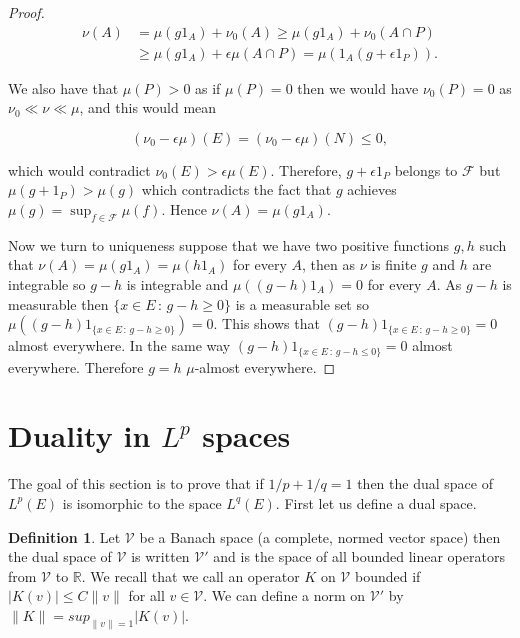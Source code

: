 \documentclass[
]{book}
\theoremstyle{definition}
\newtheorem{definition}{Definition}[chapter]
\theoremstyle{definition}
\theoremstyle{definition}
\theoremstyle{definition}
\theoremstyle{remark}
\begin{document}
\begin{proof}
\begin{align*}
\nu(A) &= \mu(g1_A) + \nu_0(A) \geq \mu(g1_A) + \nu_0(A \cap P) \\
& \geq \mu(g1_A) + \epsilon \mu(A \cap P) = \mu(1_A(g +\epsilon 1_{P})).
\end{align*}

We also have that \(\mu(P) >0\) as if \(\mu(P) = 0\) then we would have \(\nu_0(P)=0\) as \(\nu_0 \ll \nu \ll \mu\), and this would mean

\[ (\nu_0 - \epsilon \mu)(E) = (\nu_0 - \epsilon \mu)(N) \leq 0, \]

which would contradict \(\nu_0(E) > \epsilon \mu(E)\). Therefore, \(g+ \epsilon 1_P\) belongs to \(\mathcal{F}\) but \(\mu(g+1_P) > \mu(g)\) which contradicts the fact that \(g\) achieves \(\mu(g) = \sup_{f \in \mathcal{F}} \mu(f)\). Hence \(\nu(A) = \mu(g1_A)\).

Now we turn to uniqueness suppose that we have two positive functions \(g,h\) such that \(\nu(A) = \mu(g1_A) = \mu(h1_A)\) for every \(A\), then as \(\nu\) is finite \(g\) and \(h\) are integrable so \(g-h\) is integrable and \(\mu((g-h)1_A) = 0\) for every \(A\). As \(g-h\) is measurable then \(\{x \in E\,:\, g-h \geq 0\}\) is a measurable set so \(\mu((g-h)1_{\{x \in E\,:\, g-h \geq 0\}}) = 0\). This shows that \((g-h)1_{\{x \in E\,:\, g-h \geq 0\}} = 0\) almost everywhere. In the same way \((g-h)1_{\{ x \in E\,:\, g-h \leq 0\}} =0\) almost everywhere. Therefore \(g=h\) \(\mu\)-almost everywhere.
\end{proof}

\hypertarget{duality-in-lp-spaces}{%
\section{\texorpdfstring{Duality in \(L^p\) spaces}{Duality in L\^{}p spaces}}\label{duality-in-lp-spaces}}

The goal of this section is to prove that if \(1/p+1/q =1\) then the dual space of \(L^p(E)\) is isomorphic to the space \(L^q(E)\). First let us define a dual space.

\begin{definition}
Let \(\mathcal{V}\) be a Banach space (a complete, normed vector space) then the dual space of \(\mathcal{V}\) is written \(\mathcal{V}'\) and is the space of all bounded linear operators from \(\mathcal{V}\) to \(\mathbb{R}\). We recall that we call an operator \(K\) on \(\mathcal{V}\) bounded if \(|K(v)| \leq C\|v\|\) for all \(v \in \mathcal{V}\). We can define a norm on \(\mathcal{V}'\) by \(\|K\| = sup_{\|v\| =1}|K(v)|\).
\end{definition}
\end{document}
